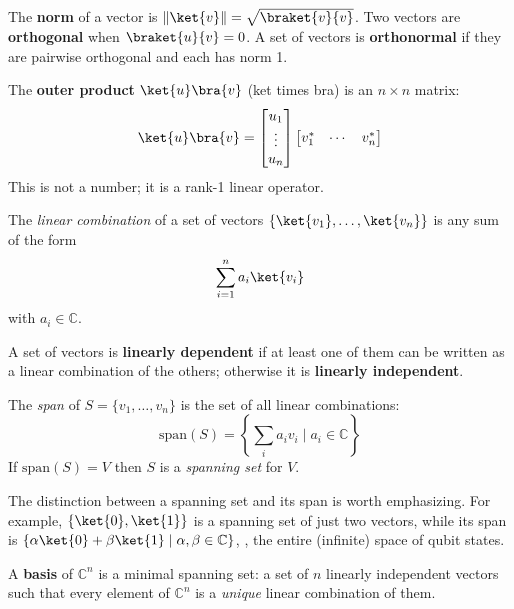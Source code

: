 \documentclass[oneside]{academica}
\begin{document}
The \textbf{norm} of a vector is $\|\ket{v}\|=\sqrt{\braket{v}{v}}$.
Two vectors are \textbf{orthogonal} when $\braket{u}{v}=0$.
A set of vectors is \textbf{orthonormal} if they are pairwise orthogonal and each has norm 1.

The \textbf{outer product} $\ket{u}\bra{v}$ (ket times bra) is an $n\times n$ matrix:
\begin{equation*}
  \ket{u}\bra{v} = \begin{bmatrix}u_1\\\vdots\\u_n\end{bmatrix}
  \begin{bmatrix}v_1^*&\cdots&v_n^*\end{bmatrix}
\end{equation*}
This is not a number; it is a rank-1 linear operator.

\begin{definition*}
  The \emph{linear combination} of a set of vectors $\{\ket{v_1},\ldots,\ket{v_n}\}$ is any sum of the form
  \begin{equation*}
    \sum_{i=1}^n a_i\ket{v_i}
  \end{equation*}
  with $a_i\in\mathbb{C}$.
\end{definition*}

A set of vectors is \textbf{linearly dependent} if at least one of them can be written as a linear combination of the others; otherwise it is \textbf{linearly independent}.

\begin{definition*}[Span]
  The \emph{span} of $S=\{v_1,\ldots,v_n\}$ is the set of all linear combinations:
  \begin{equation*}
    \text{span}(S)=\left\{\sum_i a_i v_i \mid a_i\in\mathbb{C}\right\}
  \end{equation*}
  If $\text{span}(S)=V$ then $S$ is a \emph{spanning set} for $V$.
\end{definition*}

The distinction between a spanning set and its span is worth emphasizing.
For example, $\{\ket{0},\ket{1}\}$ is a spanning set of just two vectors, while its span is $\{\alpha\ket{0}+\beta\ket{1}\mid\alpha,\beta\in\mathbb{C}\}$, \ie, the entire (infinite) space of qubit states.

A \textbf{basis} of $\mathbb{C}^n$ is a minimal spanning set: a set of $n$ linearly independent vectors such that every element of $\mathbb{C}^n$ is a \emph{unique} linear combination of them.
\end{document}
